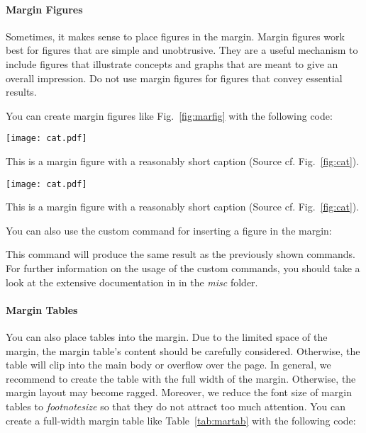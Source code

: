 \paragraph{Margin Figures} Sometimes, it makes sense to place figures in the margin. Margin figures work best for figures that are simple and unobtrusive. They are a useful mechanism to include figures that illustrate concepts and graphs that are meant to give an overall impression. Do not use margin figures for figures that convey essential results.

You can create margin figures like Fig.~\ref{fig:marfig} with the following code:

\begin{marginfigure}[-5\baselineskip] %
\texttt{[image: cat.pdf]}
\caption{\label{fig:marfig}This is a margin figure with a reasonably short caption (Source cf. Fig.~\ref{fig:cat}).}
\end{marginfigure}

\begin{latex}
\begin{marginfigure}[-1\baselineskip] %
\texttt{[image: cat.pdf]}
\caption{\label{fig:marfig}This is a margin figure with a reasonably short caption (Source cf. Fig.~\ref{fig:cat}).}
\end{marginfigure}
\end{latex}

You can also use the custom command  for inserting a figure in the margin:

\begin{latex}
\end{latex}

This command will produce the same result as the previously shown commands.
For further information on the usage of the custom commands, you should take a look at the extensive documentation in  in the \emph{misc} folder.

\paragraph{Margin Tables} You can also place tables into the margin. Due to the limited space of the margin, the margin table's content should be carefully considered. Otherwise, the table will clip into the main body or overflow over the page. In general, we recommend to create the table with the full width of the margin. Otherwise, the margin layout may become ragged. Moreover, we reduce the font size of margin tables to \emph{footnotesize} so that they do not attract too much attention.
%
You can create a full-width margin table like Table~\ref{tab:martab} with the following code:

